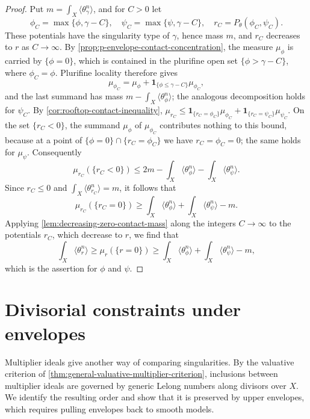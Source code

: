 \begin{proof}
Put $m=\int_X\langle\theta_\gamma^n\rangle$, and for $C>0$ let
\[
 \phi_C=\max\{\phi,\gamma-C\},\quad
 \psi_C=\max\{\psi,\gamma-C\},\quad
 r_C=P_\theta(\phi_C,\psi_C).
\]
These potentials have the singularity type of $\gamma$, hence mass $m$, and $r_C$ decreases to $r$ as $C\to\infty$. By \cref{prop:p-envelope-contact-concentration}, the measure $\mu_\phi$ is carried by $\{\phi=0\}$, which is contained in the plurifine open set $\{\phi>\gamma-C\}$, where $\phi_C=\phi$. Plurifine locality therefore gives
\[
 \mu_{\phi_C}=\mu_\phi+
                  \mathbf1_{\{\phi\leq\gamma-C\}}\mu_{\phi_C},
\]
and the last summand has mass $m-\int_X\langle\theta_\phi^n\rangle$; the analogous decomposition holds for $\psi_C$. By \cref{cor:rooftop-contact-inequality}, $\mu_{r_C}\leq\mathbf1_{\{r_C=\phi_C\}}\mu_{\phi_C}+\mathbf1_{\{r_C=\psi_C\}}\mu_{\psi_C}$. On the set $\{r_C<0\}$, the summand $\mu_\phi$ of $\mu_{\phi_C}$ contributes nothing to this bound, because at a point of $\{\phi=0\}\cap\{r_C=\phi_C\}$ we have $r_C=\phi_C=0$; the same holds for $\mu_\psi$. Consequently
\[
 \mu_{r_C}(\{r_C<0\})\leq2m-\int_X\langle\theta_\phi^n\rangle-\int_X\langle\theta_\psi^n\rangle.
\]
Since $r_C\leq0$ and $\int_X\langle\theta_{r_C}^n\rangle=m$, it follows that
\[
 \mu_{r_C}(\{r_C=0\})\geq\int_X\langle\theta_\phi^n\rangle+\int_X\langle\theta_\psi^n\rangle-m.
\]
Applying \cref{lem:decreasing-zero-contact-mass} along the integers $C\to\infty$ to the potentials $r_C$, which decrease to $r$, we find that
\[
 \int_X\langle\theta_r^n\rangle\geq\mu_r(\{r=0\})
      \geq\int_X\langle\theta_\phi^n\rangle+\int_X\langle\theta_\psi^n\rangle-m,
\]
which is the assertion for $\phi$ and $\psi$.
\end{proof}

\section{Divisorial constraints under envelopes}
\label{sec:divisorial-envelope-constraints}
Multiplier ideals give another way of comparing singularities. By the valuative criterion of \cref{thm:general-valuative-multiplier-criterion}, inclusions between multiplier ideals are governed by generic Lelong numbers along divisors over $X$. We identify the resulting order and show that it is preserved by upper envelopes, which requires pulling envelopes back to smooth models.

